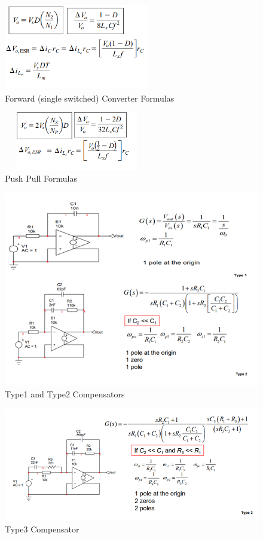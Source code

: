 \documentclass[twocolumn, ]{article}
\begin{document}
\begin{figure}[!ht]
	\includegraphics[width=2.5in,height=1.5in]{forwardsingleswitch.png}
	\caption{Forward (single switched) Converter Formulas}
\end{figure}
\begin{figure}[!ht]
	\includegraphics[width=2.5in,height=1in]{pushpull_someformulas.png}
	\caption{Push Pull Formulas}
\end{figure}
\begin{figure}[!ht]
	\includegraphics[scale=0.30]{type1_type2.png}
	\caption{Type1 and Type2 Compensators}
\end{figure}
\begin{figure}[!ht]
	\includegraphics[scale=0.30]{type3.png}
	\caption{Type3 Compensator}
\end{figure}
\end{document}
